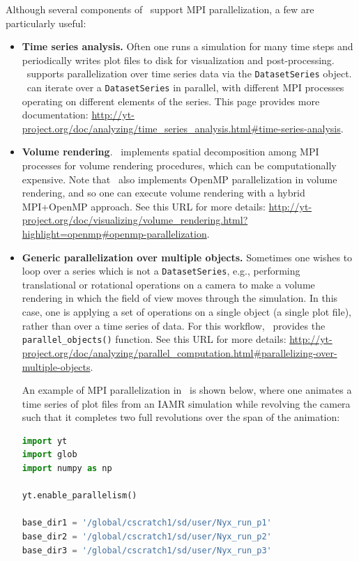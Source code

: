 Although several components of \yt\ support MPI parallelization, a few are particularly useful:
\begin{itemize}
  \item \textbf{Time series analysis.} Often one runs a simulation for many
time steps and periodically writes plot files to disk for visualization and
post-processing. \yt\ supports parallelization over time series data via the
\texttt{DatasetSeries} object. \yt\ can iterate over a \texttt{DatasetSeries}
in parallel, with different MPI processes operating on different elements of
the series. This page provides more documentation:
\url{http://yt-project.org/doc/analyzing/time_series_analysis.html#time-series-analysis}.

  \item \textbf{Volume rendering}. \yt\ implements spatial decomposition among
MPI processes for volume rendering procedures, which can be computationally
expensive. Note that \yt\ also implements OpenMP parallelization in volume
rendering, and so one can execute volume rendering with a hybrid MPI+OpenMP
approach. See this URL for more details:
\url{http://yt-project.org/doc/visualizing/volume_rendering.html?highlight=openmp#openmp-parallelization}.

  \item \textbf{Generic parallelization over multiple objects.} Sometimes one
wishes to loop over a series which is not a \texttt{DatasetSeries}, e.g.,
performing translational or rotational operations on a camera to make a volume
rendering in which the field of view moves through the simulation. In this
case, one is applying a set of operations on a single object (a single plot
file), rather than over a time series of data. For this workflow, \yt\ provides
the \texttt{parallel\_objects()} function. See this URL for more details:
\url{http://yt-project.org/doc/analyzing/parallel_computation.html#parallelizing-over-multiple-objects}.

An example of MPI parallelization in \yt\ is shown below, where one animates a
time series of plot files from an IAMR simulation while revolving the camera
such that it completes two full revolutions over the span of the animation:

\begin{lstlisting}[language=python,breaklines=true]
import yt
import glob
import numpy as np

yt.enable_parallelism()

base_dir1 = '/global/cscratch1/sd/user/Nyx_run_p1'
base_dir2 = '/global/cscratch1/sd/user/Nyx_run_p2'
base_dir3 = '/global/cscratch1/sd/user/Nyx_run_p3'


\end{lstlisting}
\end{itemize}
